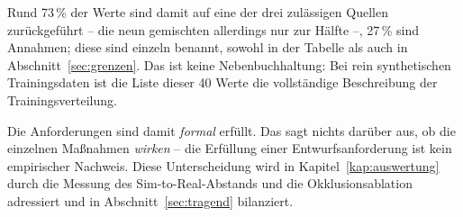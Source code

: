 Rund 73\,\% der Werte sind damit auf eine der drei zulässigen Quellen
zurückgeführt -- die neun gemischten allerdings nur zur Hälfte --, 27\,\% sind
Annahmen; diese sind einzeln benannt, sowohl in der Tabelle als auch in
Abschnitt~\ref{sec:grenzen}. Das ist keine
Nebenbuchhaltung: Bei rein synthetischen Trainingsdaten ist die Liste dieser
40 Werte die vollständige Beschreibung der Trainingsverteilung.

Die Anforderungen sind damit \emph{formal} erfüllt. Das sagt nichts darüber aus,
ob die einzelnen Maßnahmen \emph{wirken} -- die Erfüllung einer
Entwurfsanforderung ist kein empirischer Nachweis. Diese Unterscheidung wird in
Kapitel~\ref{kap:auswertung} durch die Messung des Sim-to-Real-Abstands und die
Okklusionsablation adressiert und in Abschnitt~\ref{sec:tragend} bilanziert.
